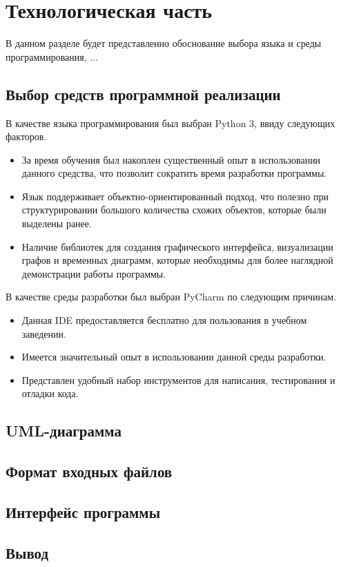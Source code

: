 \section{Технологическая часть}

В данном разделе будет представленно обоснование выбора языка и среды программирования, ...

\subsection{Выбор средств программной реализации}
В качестве языка программирования был выбран Python 3, ввиду следующих факторов.

\begin{itemize}
	\item За время обучения был накоплен существенный опыт в использовании данного средства, что позволит сократить время разработки программы.
	\item Язык поддерживает объектно-ориентированный подход, что полезно при структурировании большого количества схожих объектов, которые были выделены ранее.
	\item Наличие библиотек для создания графического интерфейса, визуализации графов и временных диаграмм, которые необходимы для более наглядной демонстрации работы программы.
\end{itemize}
\qquad
В качестве среды разработки был выбран PyCharm по следующим причинам.
\begin{itemize}
	\item Данная IDE предоставляется бесплатно для пользования в учебном заведении\cite{tech:pycharm}.
	\item Имеется значительный опыт в использовании данной среды разработки.
	\item Представлен удобный набор инструментов для написания, тестирования и отладки кода.
\end{itemize}

\subsection{UML-диаграмма}

\subsection{Формат входных файлов}

\subsection{Интерфейс программы}

\subsection*{Вывод}

\pagebreak